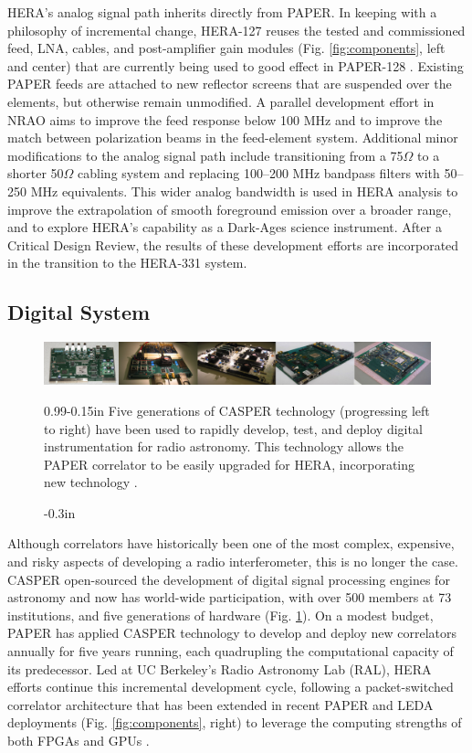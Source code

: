 \documentclass[ars]{copernicus}
\begin{document}
HERA's analog signal path inherits directly from PAPER.
In keeping with a philosophy of
incremental change,
HERA-127 reuses the tested and commissioned feed, LNA, cables, and post-amplifier gain modules
(Fig. \ref{fig:components}, left and center) that are currently being
used to good effect in PAPER-128 \citep{parsons_et_al2010}.  Existing PAPER feeds are attached to new
reflector screens that are suspended over the elements, but otherwise remain unmodified.
A parallel development effort in NRAO aims to improve the feed response below
100 MHz 
and to improve the match between polarization beams in the feed-element system.  
Additional
minor modifications to the analog signal path include transitioning from a 75$\Omega$ to a
shorter 50$\Omega$ cabling system and replacing 100--200 MHz bandpass filters with 50--250 MHz equivalents.
This wider analog bandwidth is used in HERA analysis to improve the extrapolation of smooth foreground
emission over a broader range, and to explore HERA's capability as a Dark-Ages science instrument.
After a Critical Design Review, the results of these development efforts are incorporated in
the transition to the HERA-331 system.  


\subsection{Digital System}
\label{sec:digital}

\begin{figure}[t]\centering
\includegraphics[width=6.5in]{plots/casper_boards.jpg}
\caption{-0.3in}{0.99}{-0.15in}{\small
Five generations of CASPER technology (progressing left to right) have been used to rapidly
develop, test, and deploy digital instrumentation for radio astronomy.  This technology
allows the PAPER correlator to be 
easily upgraded for HERA, incorporating new technology
\citep{parsons_et_al2006,parsons_et_al2008}.
}\label{fig:casper_boards}
\end{figure}

Although correlators have historically been one of the most complex,
expensive, and risky aspects of developing a radio interferometer, this is no longer the case.
CASPER \citep{parsons_et_al2006}
open-sourced the development of digital signal processing engines for astronomy and
now has world-wide participation,
with over 500 members at 73 institutions, and 
five generations of hardware (Fig. \ref{fig:casper_boards}). 
On a modest budget, PAPER has applied CASPER technology to develop and deploy new correlators
annually for five years running, each quadrupling the computational capacity of its predecessor.
Led at UC Berkeley's Radio Astronomy Lab (RAL),
HERA efforts continue this incremental development cycle, following a packet-switched
correlator architecture \citep{parsons_et_al2008} that has been
extended in recent PAPER and LEDA deployments (Fig. \ref{fig:components}, right)
to leverage the computing strengths of both FPGAs and GPUs \citep{clark_et_al2011}.
\end{document}
